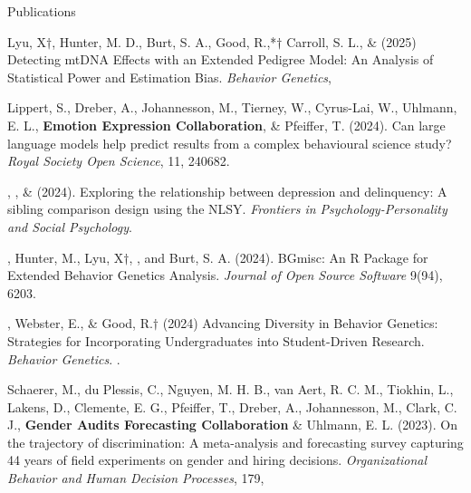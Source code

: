 \begin{rSection}{\textrm{Publications}}
\begin{etaremune}
\item Lyu, X$\dagger$, Hunter, M. D., Burt, S. A., Good, R.,*$\dagger$ Carroll, S. L., \& \meb (2025) Detecting mtDNA Effects with an Extended Pedigree Model: An Analysis of Statistical Power and Estimation Bias. \textit{Behavior Genetics}, 

\item Lippert, S., Dreber, A., Johannesson, M., Tierney, W., Cyrus-Lai, W., Uhlmann, E. L., \textbf{Emotion Expression Collaboration}, \& Pfeiffer, T. (2024). Can large language models help predict results from a complex behavioural science study? \textit{Royal Society Open Science}, 11, 240682. 

\item \emsims, \jt, \& \meb (2024). Exploring the relationship between depression and delinquency: A sibling comparison design using the NLSY.  \textit{Frontiers in Psychology-Personality and Social Psychology}. 

\item \meb, Hunter, M., Lyu, X$\dagger$, \jdt, and Burt, S. A. (2024). BGmisc: An R Package for Extended Behavior Genetics Analysis. \textit{Journal of Open Source Software} 9(94), 6203. 
\item \meb, Webster, E.\noteA, \& Good, R.\noteA$\dagger$ (2024) Advancing Diversity in Behavior Genetics: Strategies for Incorporating Undergraduates into Student-Driven Research. \textit{Behavior Genetics}. . 
\item Schaerer, M., du Plessis, C., Nguyen, M. H. B., van Aert, R. C. M., Tiokhin, L., Lakens, D., Clemente, E. G., Pfeiffer, T., Dreber, A., Johannesson, M., Clark, C. J., \textbf{Gender Audits Forecasting Collaboration} \& Uhlmann, E. L. (2023). On the trajectory of discrimination: A meta-analysis and forecasting survey capturing 44 years of field experiments on gender and hiring decisions. \textit{Organizational Behavior and Human Decision Processes}, 179, 


\end{etaremune}
\end{rSection}
